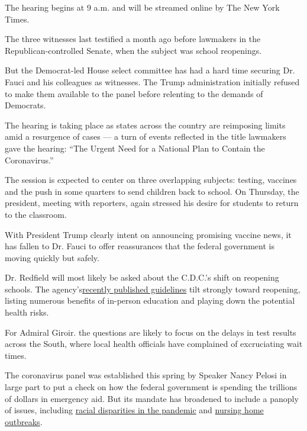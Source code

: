 The hearing begins at 9 a.m. and will be streamed online by The New York
Times.

The three witnesses last testified a month ago before lawmakers in the
Republican-controlled Senate, when the subject was school reopenings.

But the Democrat-led House select committee has had a hard time securing
Dr. Fauci and his colleagues as witnesses. The Trump administration
initially refused to make them available to the panel before relenting
to the demands of Democrats.

The hearing is taking place as states across the country are reimposing
limits amid a resurgence of cases --- a turn of events reflected in the
title lawmakers gave the hearing: ``The Urgent Need for a National Plan
to Contain the Coronavirus.''

The session is expected to center on three overlapping subjects:
testing, vaccines and the push in some quarters to send children back to
school. On Thursday, the president, meeting with reporters, again
stressed his desire for students to return to the classroom.

With President Trump clearly intent on announcing promising vaccine
news, it has fallen to Dr. Fauci to offer reassurances that the federal
government is moving quickly but safely.

Dr. Redfield will most likely be asked about the C.D.C.'s shift on
reopening schools. The
agency's\href{https://www.nytimes.com/2020/07/24/health/cdc-schools-coronavirus.html}{recently
published guidelines} tilt strongly toward reopening, listing numerous
benefits of in-person education and playing down the potential health
risks.

For Admiral Giroir. the questions are likely to focus on the delays in
test results across the South, where local health officials have
complained of excruciating wait times.

The coronavirus panel was established this spring by Speaker Nancy
Pelosi in large part to put a check on how the federal government is
spending the trillions of dollars in emergency aid. But its mandate has
broadened to include a panoply of issues, including
\href{https://coronavirus.house.gov/subcommittee-activity/briefings/coronavirus-panel-hold-member-briefing-racial-health-disparities}{racial
disparities in the pandemic} and
\href{https://coronavirus.house.gov/subcommittee-activity/briefings/devastating-impact-coronavirus-crisis-america-s-nursing-homes}{nursing
home outbreaks}.

